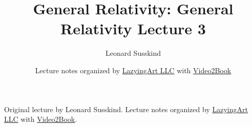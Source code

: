 \documentclass[11pt,oneside]{book}
\begin{document}
\frontmatter
\title{General Relativity: General Relativity Lecture 3}
\author{Leonard Susskind}
\date{Lecture notes organized by \href{https://lazying.art}{LazyingArt LLC} with \href{https://github.com/lachlanchen/Video2Book}{Video2Book}}
\maketitle
\begin{center}
\small Original lecture by Leonard Susskind. Lecture notes organized by \href{https://lazying.art}{LazyingArt LLC} with \href{https://github.com/lachlanchen/Video2Book}{Video2Book}.
\end{center}
\clearpage
\mainmatter

\end{document}
